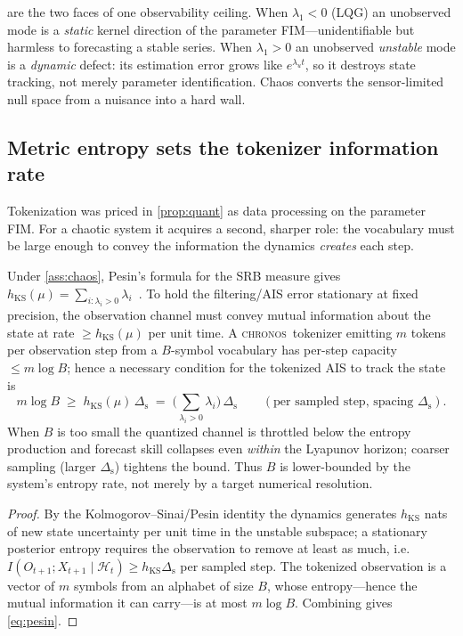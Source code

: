 \documentclass[10pt]{article}
\theoremstyle{plain}
\theoremstyle{definition}
\theoremstyle{remark}
\newcommand{\Chronos}{\textsc{chronos}}
\newcommand{\srb}{\mu}
\newcommand{\hKS}{h_{\mathrm{KS}}}
\begin{document}
\begin{remark}
 are the two faces of one observability
ceiling. When $\lambda_1<0$ (LQG) an unobserved mode is a \emph{static} kernel
direction of the parameter FIM---unidentifiable but harmless to forecasting a
stable series. When $\lambda_1>0$ an unobserved \emph{unstable} mode is a
\emph{dynamic} defect: its estimation error grows like $e^{\lambda_u t}$, so it
destroys state tracking, not merely parameter identification. Chaos converts the
sensor-limited null space from a nuisance into a hard wall.
\end{remark}

\subsection{Metric entropy sets the tokenizer information rate}
Tokenization was priced in \cref{prop:quant} as data processing on the parameter
FIM. For a chaotic system it acquires a second, sharper role: the vocabulary must
be large enough to convey the information the dynamics \emph{creates} each step.

\begin{proposition}\label{prop:pesin}
Under \cref{ass:chaos}, Pesin's formula for the SRB measure
gives $\hKS(\srb)=\sum_{i:\lambda_i>0}\lambda_i$~\cite{pesin1977,%
ledrappieryoung1985,young2002}. To hold the filtering/AIS error stationary at
fixed precision, the observation channel must convey mutual information about the
state at rate $\ge\hKS(\srb)$ per unit time. A \Chronos\ tokenizer emitting $m$
tokens per observation step from a $B$-symbol vocabulary has per-step capacity
$\le m\log B$; hence a necessary condition for the tokenized AIS to track the
state is
\begin{equation}
 m\log B\;\ge\;\hKS(\srb)\,\Delta_{\mathrm s}
 \;=\;\Big(\!\sum_{\lambda_i>0}\lambda_i\Big)\,\Delta_{\mathrm s}
 \qquad(\text{per sampled step, spacing }\Delta_{\mathrm s}).
 \label{eq:pesin}
\end{equation}
When $B$ is too small the quantized channel is throttled below the entropy
production and forecast skill collapses even \emph{within} the Lyapunov horizon;
coarser sampling (larger $\Delta_{\mathrm s}$) tightens the bound. Thus $B$ is
lower-bounded by the system's entropy rate, not merely by a target numerical
resolution.
\end{proposition}
\begin{proof}
By the Kolmogorov--Sinai/Pesin identity the dynamics generates $\hKS$ nats of new
state uncertainty per unit time in the unstable subspace; a stationary posterior
entropy requires the observation to remove at least as much, i.e.\
$I(O_{t+1};X_{t+1}\mid\mathcal H_t)\ge\hKS\Delta_{\mathrm s}$ per sampled step.
The tokenized observation is a vector of $m$ symbols from an alphabet of size $B$,
whose entropy---hence the mutual information it can carry---is at most $m\log B$.
Combining gives \eqref{eq:pesin}.
\end{proof}
\end{document}
